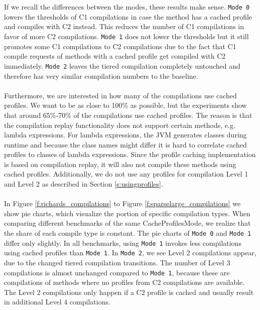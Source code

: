 \\\\
If we recall the differences between the modes, these results make sense. \texttt{Mode 0} lowers the thresholds of C1 compilations in case the method has a cached profile and compiles with C2 instead. This reduces the number of C1 compilations in favor of more C2 compilations. \texttt{Mode 1} does not lower the thresholds but it still promotes some C1 compilations to C2 compilations due to the fact that C1 compile requests of methods with a cached profile get compiled with C2 immediately.
\texttt{Mode 2} leaves the tiered compilation completely untouched and therefore has very similar compilation numbers to the baseline.
\\\\
Furthermore, we are interested in how many of the compilations use cached profiles. We want to be as close to 100\% as possible, but the experiments show that around 65\%-70\% of the compilations use cached profiles.
The reason is that the compilation replay functionality does not support certain methods, e.g. lambda expressions. For lambda expressions, the JVM generates classes during runtime and because the class names might differ it is hard to correlate cached profiles to classes of lambda expressions. Since the profile caching implementation is based on compilation replay, it will also not compile these methods using cached profiles. 
Additionally, we do not use any profiles for compilation Level 1 and Level 2 as described in Section \ref{s:usingprofiles}.
\\\\
In Figure \ref{f:richards_compilations} to Figure \ref{f:sparselarge_compilations} we show pie charts, which visualize the portion of specific compilation types.
When comparing different benchmarks of the same CacheProfilesMode, we realize that the share of each compile type is constant.
The pie charts of \texttt{Mode 0} and \texttt{Mode 1} differ only slightly. In all benchmarks, using \texttt{Mode 1} invokes less compilations using cached profiles than \texttt{Mode 1}.
In \texttt{Mode 2}, we see Level 2 compilations appear, due to the changed tiered compilation transitions. The number of Level 3 compilations is almost unchanged compared to \texttt{Mode 1}, because these are compilations of methods where no profiles from C2 compilations are available.
The Level 2 compilations only happen if a C2 profile is cached and usually result in additional Level 4 compilations. 
